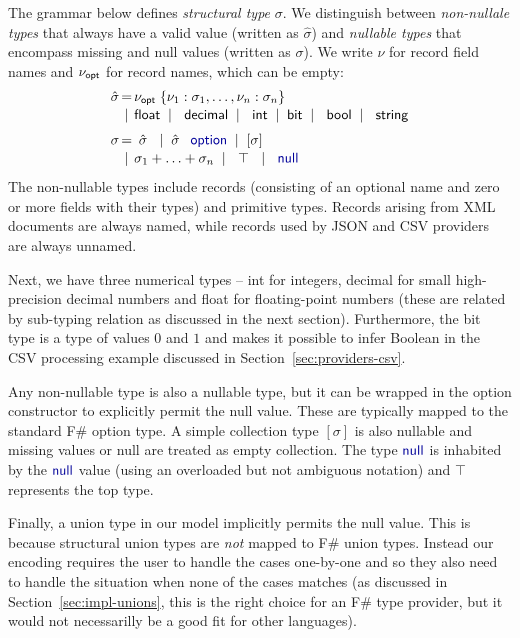 \documentclass[preprint]{sigplanconf}
\newcommand{\kvd}[1]{\textnormal{\textcolor{kvdclr}{\sffamily #1}}}
\newcommand{\ident}[1]{\textnormal{\sffamily #1}}
\newcommand{\lsep}[0]{\;\; | \;\;}
\newcommand{\narrow}[1]{\hspace{-0.85em} #1 \hspace{-0.85em}}
\begin{document}
The grammar below defines \emph{structural type} $\sigma$. We distinguish between \emph{non-nullale types}
that always have a valid value (written as $\hat{\sigma}$) and \emph{nullable types} that encompass missing 
and \kvd{null} values (written as $\sigma$). We write $\nu$ for record field names and $\nu_{\ident{opt}}$
for record names, which can be empty:
%
\begin{equation*}
\begin{array}{rcl}
 \hat{\sigma} &\narrow{=}& \nu_{\ident{opt}}\; \{ \nu_1 : \sigma_1, \ldots, \nu_n : \sigma_n \} \\[0.1em]
                &\narrow{|}& \ident{float} \lsep \ident{decimal} \lsep \ident{int} \lsep \ident{bit} \lsep \ident{bool} \lsep \ident{string} 
 \\[0.6em] 
       \sigma &\narrow{=}& ~\hat{\sigma}~ \lsep \hat{\sigma}\;\,\kvd{option} \lsep [\sigma] \\[0.1em]
              &\narrow{|}& \sigma_1 + \ldots + \sigma_n \lsep ~\top~ \lsep \kvd{null}
\end{array}
\end{equation*}
%
The non-nullable types include records (consisting of an optional name and zero or more fields with
their types) and primitive types. Records arising from XML documents are always named, while records
used by JSON and CSV providers are always unnamed. 

Next, we have three numerical types -- \ident{int} for integers, \ident{decimal} for small high-precision 
decimal numbers and \ident{float} for floating-point numbers (these are related by sub-typing relation as
discussed in the next section). Furthermore, the \ident{bit} type is a type of values $0$ and $1$ and 
makes it possible to infer Boolean in the CSV processing example discussed in Section~\ref{sec:providers-csv}.

Any non-nullable type is also a nullable type, but it can be wrapped in the \kvd{option}
constructor to explicitly permit the \kvd{null} value. These are typically mapped to the standard F\# option 
type. A simple collection type $[\sigma]$ is also nullable and missing values or \kvd{null} are treated as 
empty collection. The type $\kvd{null}$ is inhabited by the $\kvd{null}$ value (using an overloaded but not
ambiguous notation) and $\top$ represents the top type.

Finally, a union type in our model implicitly permits the \kvd{null} value. This is because structural union 
types are \emph{not} mapped to F\# union types. Instead our encoding requires the user to handle the 
cases one-by-one and so they also need to handle the situation when none of the cases matches (as discussed
in Section~\ref{sec:impl-unions}, this is the right choice for an F\# type provider, but it would not 
necessarilly be a good fit for other languages).
\end{document}
